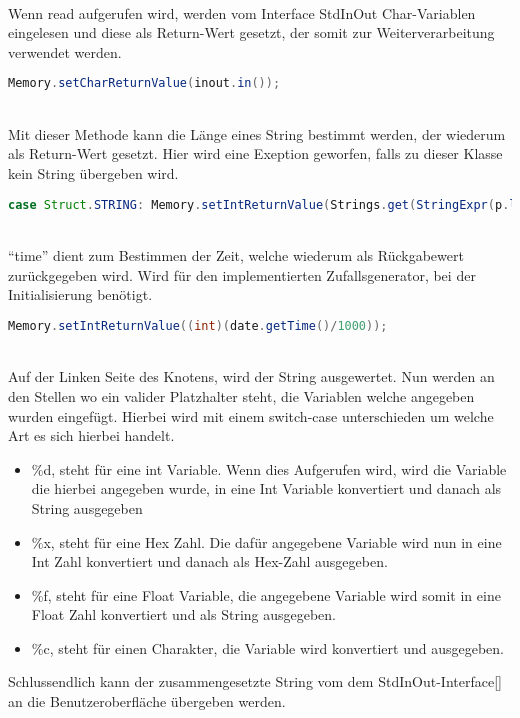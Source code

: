 \\
Wenn read aufgerufen wird, werden vom Interface StdInOut Char-Variablen eingelesen und diese als Return-Wert gesetzt, der somit zur Weiterverarbeitung verwendet werden.
\begin{lstlisting}[language=JAVA]
Memory.setCharReturnValue(inout.in());
\end{lstlisting}

\\
Mit dieser Methode kann die Länge eines String bestimmt werden, der wiederum als Return-Wert gesetzt. Hier wird eine Exeption geworfen, falls zu dieser Klasse kein String übergeben wird.
\begin{lstlisting}[language=JAVA]
case Struct.STRING:	Memory.setIntReturnValue(Strings.get(StringExpr(p.left)).length());
\end{lstlisting}

\\
``time'' dient zum Bestimmen der Zeit, welche wiederum als Rückgabewert zurückgegeben wird. Wird für den implementierten Zufallsgenerator, bei der Initialisierung benötigt.
\begin{lstlisting}[language=JAVA]
Memory.setIntReturnValue((int)(date.getTime()/1000));
\end{lstlisting}

\\
Auf der Linken Seite des Knotens, wird der String ausgewertet. Nun werden an den Stellen wo ein valider Platzhalter steht, die Variablen welche angegeben wurden eingefügt. Hierbei wird mit einem switch-case unterschieden um welche Art es sich hierbei handelt.
\begin{itemize}
\item \%d, steht für eine int Variable. Wenn dies Aufgerufen wird, wird die Variable die hierbei angegeben wurde, in eine Int Variable konvertiert und danach als String ausgegeben
\item \%x, steht für eine Hex Zahl. Die dafür angegebene Variable wird nun in eine Int Zahl konvertiert und danach als Hex-Zahl ausgegeben.
\item \%f, steht für eine Float Variable, die angegebene Variable wird somit in eine Float Zahl konvertiert und als String ausgegeben.
\item \%c, steht für einen Charakter, die Variable wird konvertiert und ausgegeben. 
\end{itemize}
Schlussendlich kann der zusammengesetzte String vom dem StdInOut-Interface\ref{} an die Benutzeroberfläche übergeben werden.

